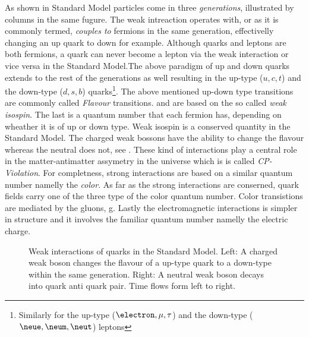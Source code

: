As shown in  Standard Model particles come in three {\it generations}, illustrated by columns in the same fugure.
The weak intreaction operates with, or as it is commonly termed, {\it couples to} fermions in the same generation, effectivelly
changing an up quark to down for example. Although quarks and leptons are both fermions, a quark can never become a lepton via
the weak interaction or vice versa in the Standard Model.The above paradigm of up and down quarks extends to the rest of the
generations as well resulting in the up-type ($u,c,t$) and the down-type ($d,s,b$) quarks\footnote{Similarly for the  up-type ($\electron,\mu,\tau$)
and the down-type ($\neue,\neum,\neut$) leptons}. The above mentioned up-down type transitions are commonly called {\it Flavour} transitions.
and are based on the so called {\it weak isospin}. The last is a quantum number that each fermion has, depending on
wheather it is of up or down type. Weak isospin is a conserved quantity in the Standard Model. The charged weak bossons \Wpm have
the ability to change the flavour whereas the neutral \Z  does not, see . These kind of interactions play a central role
in the matter-antimatter assymetry in the universe which is is called {\it CP-Violation}. For completness, strong interactions are
based on a similar quantum number namelly the {\it color}. As far as the strong interactions are conserned, quark fields carry one
of the three type of the color quantum number. Color transistions are mediated by the gluons, g. Lastly the electromagnetic interactions
is simpler in structure and it involves the familiar quantum number namelly the electric charge.

\begin{figure}[h]
  {\sffamily }
  \caption{Weak interactions of quarks in the Standard Model. Left: A charged weak boson changes the flavour of a up-type quark to a down-type within the same generation.
           Right: A neutral weak boson decays into quark anti quark pair. Time flows form left to right.}
  \label{WeakInteractions}
\end{figure}


